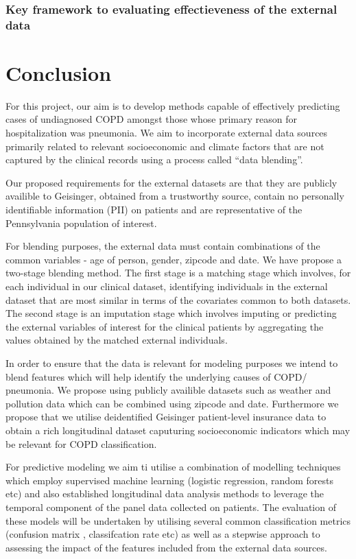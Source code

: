 \documentclass{article}
\begin{document}
\subsubsection{Key framework to evaluating effectieveness of the external data}

\section{Conclusion}
For this project, our aim is to develop methods capable of effectively 
predicting cases of undiagnosed COPD amongst those whose primary reason for 
hospitalization was pneumonia. We aim to incorporate external data sources 
primarily related to relevant socioeconomic and climate factors that 
are not captured by the clinical records using a process called ``data blending''.\newline

Our proposed requirements for the external datasets are that they are publicly
availible to Geisinger, obtained from a trustworthy source, contain no personally 
identifiable information (PII) on patients and are representative of the 
Pennsylvania population of interest.\newline

For blending purposes, the external data must contain combinations of the common
variables - age of person, gender, zipcode and date. We have propose a two-stage 
blending method. The first stage is a matching stage which involves, for each 
individual in our clinical dataset, identifying individuals in the external 
dataset that are most similar in terms of the covariates common to both datasets. 
The second stage is an imputation stage which involves imputing or predicting 
the external variables of interest for the clinical patients by aggregating the 
values obtained by the matched external individuals.\newline

In order to ensure that the data is relevant for modeling purposes we intend to 
blend features which will help identify the underlying causes of COPD/ pneumonia. 
We propose using publicly availible datasets such as weather and pollution data 
which can be combined using zipcode and date. Furthermore we propose that we utilise
deidentified Geisinger patient-level insurance data to obtain a rich longitudinal dataset    
caputuring socioeconomic indicators which may be relevant for COPD classification.

For predictive modeling we aim ti utilise a combination of modelling techniques
which employ supervised machine learning (logistic regression, random forests etc) 
and also established longitudinal data analysis methods to leverage the temporal 
component of the panel data collected on patients. The evaluation of these 
models will be undertaken by utilising several common classification metrics (confusion matrix
, classifcation rate etc) as well as a stepwise approach to assessing the 
impact of the features included from the external data sources.
\end{document}
